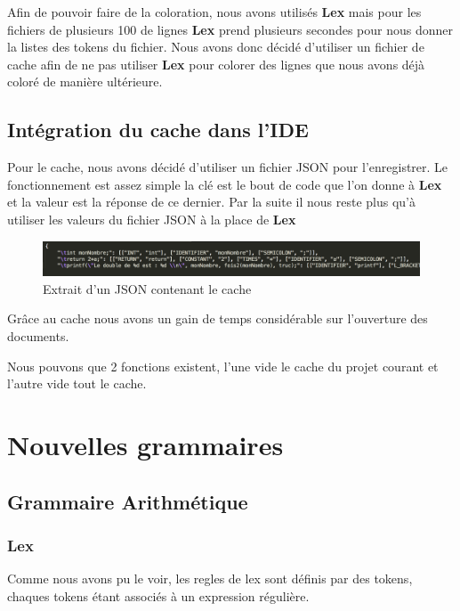 \documentclass[a4paper,12pt]{article}
\begin{document}
		Afin de pouvoir faire de la coloration, nous avons utilisés \textbf{Lex} mais pour les fichiers de plusieurs 100 de lignes \textbf{Lex} prend plusieurs secondes pour nous donner la listes des tokens du fichier. Nous avons donc décidé d'utiliser un fichier de cache afin de ne pas utiliser \textbf{Lex} pour colorer des lignes que nous avons déjà coloré de manière ultérieure.

	\subsection{Intégration du cache dans l'IDE}

		Pour le cache, nous avons décidé d'utiliser un fichier JSON pour l'enregistrer. Le fonctionnement est assez simple la clé est le bout de code que l'on donne à \textbf{Lex} et la valeur est la réponse de ce dernier. Par la suite il nous reste plus qu'à utiliser les valeurs du fichier JSON à la place de \textbf{Lex}

			\begin{figure}[h!]
				\begin{center}
					\includegraphics[scale=0.5]{images/exempleJsonCache}
					\caption{Extrait d'un JSON contenant le cache}
				\end{center}
			\end{figure}

		Grâce au cache nous avons un gain de temps considérable sur l'ouverture des documents.
		
		Nous pouvons que 2 fonctions existent, l'une vide le cache du projet courant et l'autre vide tout le cache. 

\section{Nouvelles grammaires}

	\subsection{Grammaire Arithmétique}

		\subsubsection{Lex}
			
			Comme nous avons pu le voir, les regles de lex sont définis par des tokens, chaques tokens étant associés à un expression régulière. 
\end{document}
